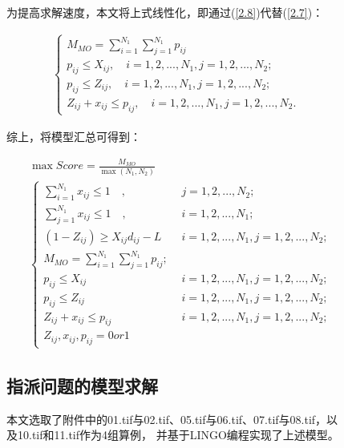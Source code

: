 \documentclass{whutmod}
\begin{document}
\begin{spacing}{1.2}
\begin{figure}[H]
为提高求解速度，本文将上式线性化，即通过(\ref{2.8})代替(\ref{2.7})：




\begin{equation}
	\label{2.8}
	\begin{split}
		\begin{cases}
			M_{MO}=\sum_{i=1}^{N_1}\sum_{j=1}^{N_1}p_{ij}\\
			p_{ij}\le X_{ij},\quad i=1,2,...,N_1,j=1,2,...,N_2;\\
			p_{ij}\le Z_{ij},\quad i=1,2,...,N_1,j=1,2,...,N_2;\\
			Z_{ij}+ x_{ij}\le p_{ij},\quad i=1,2,...,N_1,j=1,2,...,N_2.
		\end{cases}
	\end{split}
\end{equation}




综上，将模型汇总可得到：

\begin{equation}
	\label{3.2}
	\begin{split}
		&\max Score=\frac{M_{MO}}{\max(N_1,N_2)}\\
		&\begin{cases}
		\sum_{i=1}^{N_1}x_{ij}\le1 \quad ,&j=1,2,...,N_2;\\
		 \sum_{j=1}^{N_1}x_{ij}\le1 \quad ,&i=1,2,...,N_1;\\
		 (1-Z_{ij})\ge X_{ij}d_{ij}-L  \quad &i=1,2,...,N_1,j=1,2,...,N_2;\\
		 M_{MO}=\sum_{i=1}^{N_1}\sum_{j=1}^{N_1}p_{ij}; &\\
		 p_{ij}\le X_{ij}  \quad \quad &i=1,2,...,N_1,j=1,2,...,N_2;\\
		 p_{ij}\le Z_{ij}  \quad \quad &i=1,2,...,N_1,j=1,2,...,N_2;\\
		 Z_{ij}+ x_{ij}\le p_{ij}  \quad  &i=1,2,...,N_1,j=1,2,...,N_2;\\
		 Z_{ij}, x_{ij}, p_{ij} = 0 or 1
		\end{cases}
	\end{split}
\end{equation}

\subsection{指派问题的模型求解}

本文选取了附件中的01.tif与02.tif、05.tif与06.tif、07.tif与08.tif，以及10.tif和11.tif作为4组算例，
并基于LINGO编程实现了上述模型。


\end{figure}
\end{spacing}
\end{document}
